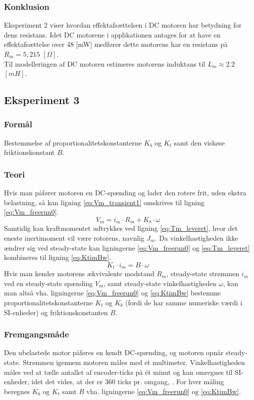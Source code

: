 \subsubsection{Konklusion}
Eksperiment 2 viser hvordan effektafsættelsen i DC motoren har betydning for dens resistans. Idet DC motorene i applikationen antages for at have en effektafsættelse over 48 [mW] medfører dette motorens har en resistans på \(R_m=5,215\) \([\Omega]\).\\

Til modelleringen af DC motoren estimeres motorens induktans til \(L_m\approx2.2\) \([mH]\).

\subsection{Eksperiment 3}
\label{ss:eksperiment3}
\subsubsection{Formål}
Bestemmelse af proportionalitetskonstanterne \(K_b\) og \(K_t\) samt den viskøse friktionskonstant \(B\).

\subsubsection{Teori}
Hvis man påfører motoren en DC-spænding og lader den rotere frit, uden ekstra belastning,
så kan ligning \ref{eq:Vm_transient1} omskrives til ligning \ref{eq:Vm_freerun0}.
\begin{equation}
	V_m=i_m\cdot{R_m}+K_b\cdot\omega
	\label{eq:Vm_freerun0}
 \end{equation}
Samtidig kan kraftmomentet udtrykkes ved ligning \ref{eq:Tm_leveret}, hvor det eneste inertimoment vil være
rotorens, navnlig \(J_m\).
Da vinkelhastigheden ikke ændrer sig ved steady-state kan ligningerne \ref{eq:Vm_freerun0} og \ref{eq:Tm_leveret} kombineres
til ligning \ref{eq:KtimBw}.
\begin{equation}
	K_t\cdot{i_m}=B\cdot\omega
	\label{eq:KtimBw}
 \end{equation}
Hvis man kender motorens ækvivalente modstand \(R_m\), steady-state strømmen \(i_m\) ved en steady-state spænding \(V_m\),
samt steady-state vinkelhastigheden \(\omega\), kan man altså vha. ligningerne \ref{eq:Vm_freerun0} og \ref{eq:KtimBw} bestemme
proportionalitetskonstanterne \(K_t\) og \(K_b\) (fordi de har samme numeriske værdi i SI-enheder) og friktionskonstanten \(B\).
\subsubsection{Fremgangsmåde}
Den ubelastede motor påføres en kendt DC-spænding, og motoren opnår steady-state.
Strømmen igennem motoren måles med et multimeter.
Vinkelhastigheden måles ved at tælle antallet af encoder-ticks på ét minut og kan omregnes til SI-enheder, 
idet det vides, at der er 360 ticks pr. omgang, \citep{emgmotor}.
For hver måling beregnes \(K_b\) og \(K_t\) samt \(B\) vha. ligningerne \ref{eq:Vm_freerun0} og \ref{eq:KtimBw}.

